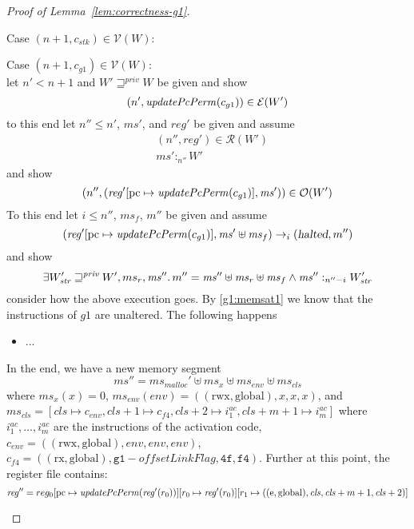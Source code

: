 \documentclass[a4paper]{article}
\newcommand{\update}[2]{[#1 \mapsto #2]}
\newcommand{\var}[1]{\mathit{#1}}
\newcommand{\hs}{\var{ms}}
\newcommand{\ms}{\hs}
\newcommand{\pcreg}{\mathrm{pc}}
\newcommand{\reg}{\var{reg}}
\newcommand{\heap}{\var{mem}}
\newcommand{\stk}{\var{stk}}
\newcommand{\olf}{\var{offsetLinkFlag}}
\newcommand{\halted}{\textsl{halted}}
\newcommand{\plainfun}[2]{
  \ifthenelse{\equal{#2}{}}
  {\mathit{#1}}
  {\mathit{#1}(#2)}
}
\newcommand{\updatePcPerm}[1]{\plainfun{updatePcPerm}{#1}}
\newcommand{\futurestr}{\mathbin{\sqsupseteq}^{\var{priv}}}
\newcommand{\heapSat}[3][\heap]{#1 :_{#2} #3}
\newcommand{\memSat}[3][n]{\heapSat[#2]{#1}{#3}}
\newcommand{\codelabel}[1]{\mathit{#1}}
\newcommand{\malloc}{\codelabel{malloc}}
\newcommand{\asmType}{\plaindom{AsmType}}
\newcommand{\plaindom}[1]{\mathrm{#1}}
\newcommand{\intr}[2]{\mathcal{#1}}
\newcommand{\valueintr}[1]{\intr{V}{#1}}
\newcommand{\exprintr}[1]{\intr{E}{#1}}
\newcommand{\regintr}[1]{\intr{R}{#1}}
\newcommand{\stdvr}{\valueintr{\asmType}}
\newcommand{\stder}{\exprintr{\asmType}}
\newcommand{\stdrr}{\regintr{\asmType}}
\newcommand{\observations}{\mathcal{O}}
\newcommand{\npair}[2][n]{\left(#1,#2 \right)}
\newcommand{\plainperm}[1]{\mathrm{#1}}
\newcommand{\exec}{\plainperm{rx}}
\newcommand{\entry}{\plainperm{e}}
\newcommand{\rwx}{\plainperm{rwx}}
\newcommand{\glob}{\plainperm{global}}
\newcommand{\step}[1][]{\rightarrow_{#1}}
\begin{document}
\begin{lemma}
\begin{proof}[Proof of Lemma~\ref{lem:correctness-g1}]
\begin{enumproof}
\begin{enumproof}
    \item Case $\npair[n+1]{c_\stk} \in \stdvr(W)$:
    \item Case $\npair[n+1]{c_{g1}} \in \stdvr(W)$:\\
      let $n' < n+1$ and $W' \futurestr W$ be given and show
      \[
        \npair[n']{\updatePcPerm{c_{g1}}} \in \stder(W')
      \]
      to this end let $n'' \leq n'$, $\ms'$, and $\reg'$ be given and assume
      \begin{align}
        & \npair[n'']{\reg'} \in \stdrr(W') \label{g1:regrel1} \\
        & \memSat[n'']{\ms'}{W'} \label{g1:memsat1}
      \end{align}
      and show
      \[
        \npair[n'']{(\reg'\update{\pcreg}{\updatePcPerm{c_{g1}}},\ms')} \in \observations(W')
      \]
      To this end let $i \leq n''$, $\ms_f$, $m''$ be given and assume
      \begin{equation}
        (\reg'\update{\pcreg}{\updatePcPerm{c_{g1}}},\ms' \uplus \ms_f) \step[i] (\halted,m'') \label{g1:execution}
      \end{equation}
      and show
      \begin{equation}
        \exists W_{\var{str}}' \futurestr W', ms_r, \ms'' \ldotp m'' = \ms'' \uplus \ms_r \uplus \ms_f \land \memSat[n''-i]{\ms''}{W_{\var{str}}'} \label{g1:g-goal}
      \end{equation}
      consider how the above execution goes. By \ref{g1:memsat1} we know that the instructions of $g1$ are unaltered. The following happens
      \begin{itemize}
      \item ...
      \end{itemize}
      In the end, we have a new memory segment
      \[
        \ms'' = \ms_\malloc' \uplus \ms_x \uplus \ms_{\var{env}} \uplus \ms_{\var{cls}}
      \]
      where $\ms_x(x) = 0$, $\ms_{\var{env}}(\var{env}) = ((\rwx,\glob),x,x,x)$, and $\ms_{\var{cls}}=[\var{cls} \mapsto c_{\var{env}}, \var{cls} + 1 \mapsto c_{f4}, \var{cls} + 2 \mapsto i^{ac}_1, \var{cls} + m + 1 \mapsto i^{ac}_m]$ where $i^{ac}_1, \dots, i^{ac}_m$ are the instructions of the activation code, $c_{\var{env}} = ((\rwx,\glob),\var{env},\var{env},\var{env})$, $c_{f4} = ((\exec,\glob),\mathtt{g1}-\olf,\mathtt{4f},\mathtt{f4})$.
      Further at this point, the register file contains:
      \[
        \reg'' = reg_0\update{\pcreg}{\updatePcPerm{\reg'(r_0)}}\update{r_0}{\reg'(r_0)}\update{r_1}{((\entry,\glob),\var{cls},\var{cls} + m + 1,\var{cls}+2)}
\]
\end{enumproof}
\end{enumproof}
\end{proof}
\end{lemma}
\end{document}
